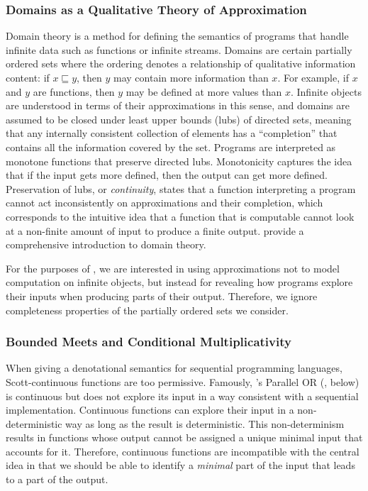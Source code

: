 \subsubsection{Domains as a Qualitative Theory of Approximation}

Domain theory is a method for defining the semantics of programs that
handle infinite data such as functions or infinite streams. Domains
are certain partially ordered sets where the ordering denotes a
relationship of qualitative information content: if $x \sqsubseteq y$,
then $y$ may contain more information than $x$. For example, if $x$
and $y$ are functions, then $y$ may be defined at more values than
$x$. Infinite objects are understood in terms of their approximations
in this sense, and domains are assumed to be closed under least upper
bounds (lubs) of directed sets, meaning that any internally consistent
collection of elements has a ``completion'' that contains all the
information covered by the set. Programs are interpreted as monotone
functions that preserve directed lubs. Monotonicity captures the idea
that if the input gets more defined, then the output can get more
defined. Preservation of lubs, or \emph{continuity}, states that a
function interpreting a program cannot act inconsistently on
approximations and their completion, which corresponds to the
intuitive idea that a function that is computable cannot look at a
non-finite amount of input to produce a finite output. \citet{abramsky-jung} provide a comprehensive introduction to domain theory.

For the purposes of \GPS, we are interested in using
approximations not to model computation on infinite objects, but instead
for revealing how programs explore their inputs when producing parts
of their output. Therefore, we ignore completeness properties of the
partially ordered sets we consider.

\subsubsection{Bounded Meets and Conditional Multiplicativity}
\label{sec:bounded-meets-and-cm}

When giving a denotational semantics for sequential programming
languages, Scott-continuous functions are too permissive. Famously,
\citet{plotkin77lcf}'s Parallel OR (, below) is
continuous but does not explore its input in a way consistent with a
sequential implementation. Continuous functions can explore their
input in a non-deterministic way as long as the result is
deterministic. This non-determinism results in functions whose
output cannot be assigned a unique minimal input that accounts for
it. Therefore, continuous functions are incompatible with the central
idea in \GPS that we should be able to identify a \emph{minimal} part
of the input that leads to a part of the output.

